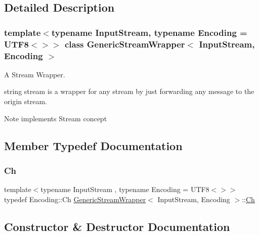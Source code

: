 \subsection{Detailed Description}
\subsubsection*{template$<$typename Input\+Stream, typename Encoding = U\+T\+F8$<$$>$$>$\newline
class Generic\+Stream\+Wrapper$<$ Input\+Stream, Encoding $>$}

A Stream Wrapper. 

string stream is a wrapper for any stream by just forwarding any  message to the origin stream. \begin{DoxyNote}{Note}
implements Stream concept 
\end{DoxyNote}


\subsection{Member Typedef Documentation}
\mbox{\label{classGenericStreamWrapper_aef9e89bc4997497315bde1b60e8bb848}} 
\subsubsection{\texorpdfstring{Ch}{Ch}}
{\footnotesize\ttfamily template$<$typename Input\+Stream , typename Encoding  = U\+T\+F8$<$$>$$>$ \\
typedef Encoding\+::\+Ch \hyperlink{classGenericStreamWrapper}{Generic\+Stream\+Wrapper}$<$ Input\+Stream, Encoding $>$\+::\hyperlink{classGenericStreamWrapper_aef9e89bc4997497315bde1b60e8bb848}{Ch}}



\subsection{Constructor \& Destructor Documentation}
\mbox{\label{classGenericStreamWrapper_a7b12b1de6337d3f8e635b650e372c803}} 
